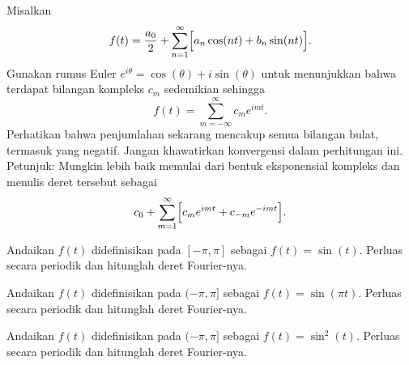 \begin{exercise}
\begin{samepage}
Misalkan
\begin{equation*}
f(t) = \frac{a_0}{2} + \sum_{n=1}^\infty
\Bigl[ a_n \cos (n t) + b_n \sin (n t) \Bigr] .
\end{equation*}
Gunakan rumus Euler $e^{i\theta} = \cos (\theta) + i \sin (\theta)$ untuk
menunjukkan bahwa terdapat bilangan kompleks $c_m$ sedemikian sehingga
\begin{equation*}
f(t) = 
\sum_{m=-\infty}^\infty c_m e^{imt} .
\end{equation*}
Perhatikan bahwa penjumlahan sekarang mencakup semua bilangan bulat, termasuk yang negatif.
Jangan khawatirkan konvergensi dalam perhitungan ini.
Petunjuk: Mungkin lebih baik memulai dari bentuk eksponensial kompleks dan menulis
deret tersebut sebagai
\begin{equation*}
c_0 + \sum_{m=1}^\infty \Bigl[ c_m e^{imt} + c_{-m} e^{-imt} \Bigr] .
\end{equation*}
\end{samepage}
\end{exercise}

\setcounter{exercise}{100}

\begin{exercise}
Andaikan $f(t)$ didefinisikan pada $[-\pi,\pi]$ sebagai $f(t) = \sin(t)$.  Perluas
secara periodik dan hitunglah deret Fourier-nya.
\end{exercise}

\begin{exercise}
Andaikan $f(t)$ didefinisikan pada $(-\pi,\pi]$ sebagai $f(t) = \sin(\pi t)$.  Perluas
secara periodik dan hitunglah deret Fourier-nya.
\end{exercise}

\begin{exercise}
Andaikan $f(t)$ didefinisikan pada $(-\pi,\pi]$ sebagai $f(t) = \sin^2(t)$.
Perluas
secara periodik dan hitunglah deret Fourier-nya.
\end{exercise}

